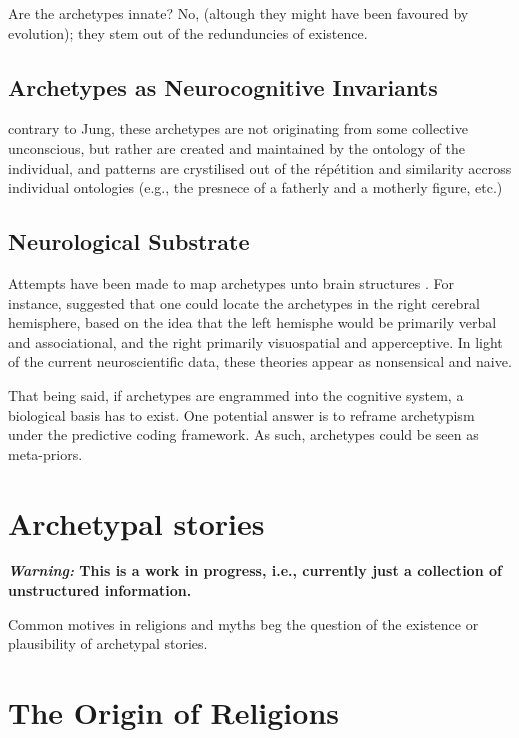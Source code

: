 \documentclass[
]{book}
\begin{document}
Are the archetypes innate? No, (altough they might have been favoured by evolution); they stem out of the redunduncies of existence.

\hypertarget{archetypes-as-neurocognitive-invariants}{%
\section{Archetypes as Neurocognitive Invariants}\label{archetypes-as-neurocognitive-invariants}}

contrary to Jung, these archetypes are not originating from some collective unconscious, but rather are created and maintained by the ontology of the individual, and patterns are crystilised out of the répétition and similarity accross individual ontologies (e.g., the presnece of a fatherly and a motherly figure, etc.)

\hypertarget{neurological-substrate}{%
\section{Neurological Substrate}\label{neurological-substrate}}

Attempts have been made to map archetypes unto brain structures \citep{samuels2003jung}. For instance, \citet{rossi1977cerebral} suggested that one could locate the archetypes in the right cerebral hemisphere, based on the idea that the left hemisphe would be primarily verbal and associational, and the right primarily visuospatial and apperceptive. In light of the current neuroscientific data, these theories appear as nonsensical and naive.

That being said, if archetypes are engrammed into the cognitive system, a biological basis has to exist. One potential answer is to reframe archetypism under the predictive coding framework. As such, archetypes could be seen as meta-priors.

\hypertarget{archetypal-stories}{%
\chapter{Archetypal stories}\label{archetypal-stories}}

\textbf{\emph{Warning:} This is a work in progress, i.e., currently just a collection of unstructured information.}

Common motives in religions and myths beg the question of the existence or plausibility of archetypal stories.

\hypertarget{the-origin-of-religions}{%
\chapter{The Origin of Religions}\label{the-origin-of-religions}}
\end{document}
